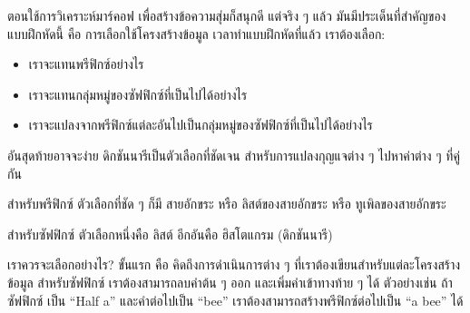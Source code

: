 ตอนใช้การวิเคราะห์มาร์คอฟ เพื่อสร้างข้อความสุ่มก็สนุกดี
แต่จริง ๆ แล้ว มันมีประเด็นที่สำคัญของแบบฝึกหัดนี้ คือ การเลือกใช้โครงสร้างข้อมูล
เวลาทำแบบฝึกหัดที่แล้ว เราต้องเลือก:

\begin{itemize}


\item เราจะแทนพรีฟิกซ์อย่างไร


\item เราจะแทนกลุ่มหมู่ของซัฟฟิกซ์ที่เป็นไปได้อย่างไร


\item เราจะแปลงจากพรีฟิกซ์แต่ละอันไปเป็นกลุ่มหมู่ของซัฟฟิกซ์ที่เป็นไปได้อย่างไร

\end{itemize}


อันสุดท้ายอาจจะง่าย
ดิกชันนารีเป็นตัวเลือกที่ชัดเจน สำหรับการแปลงกุญแจต่าง ๆ ไปหาค่าต่าง ๆ ที่คู่กัน


สำหรับพรีฟิกซ์ ตัวเลือกที่ชัด ๆ ก็มี สายอักขระ หรือ ลิสต์ของสายอักขระ หรือ ทูเพิลของสายอักขระ


สำหรับซัฟฟิกซ์
ตัวเลือกหนึ่งคือ ลิสต์
อีกอันคือ ฮิสโตแกรม (ดิกชันนารี)


เราควรจะเลือกอย่างไร?
ขั้นแรก คือ คิดถึงการดำเนินการต่าง ๆ ที่เราต้องเขียนสำหรับแต่ละโครงสร้างข้อมูล
สำหรับซัฟฟิกซ์ เราต้องสามารถลบคำต้น ๆ ออก และเพิ่มคำเข้าทางท้าย ๆ ได้
ตัวอย่างเช่น ถ้าซัฟฟิกซ์ เป็น ``Half a'' และคำต่อไปเป็น ``bee''
เราต้องสามารถสร้างพรีฟิกซ์ต่อไปเป็น ``a bee'' ได้


